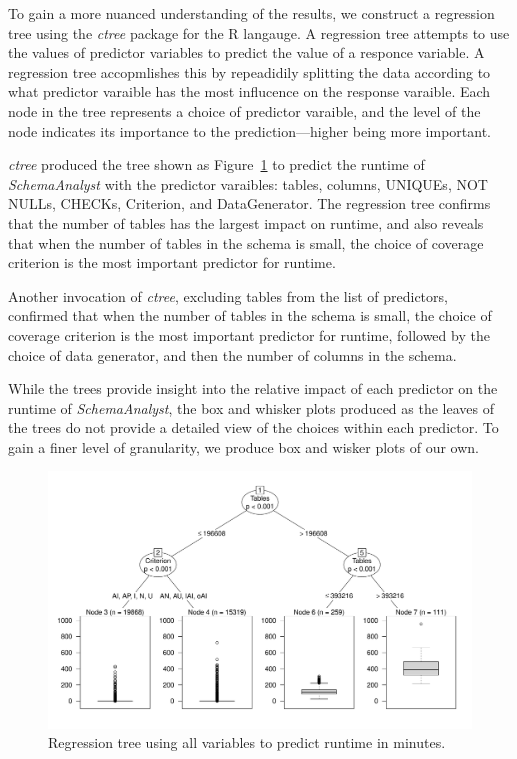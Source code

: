 
To gain a more nuanced understanding of the results, we construct a
regression tree using the \textit{ctree} package for the R langauge. A
regression tree attempts to use the values of predictor variables to
predict the value of a responce variable. A regression tree accopmlishes
this by repeadidily splitting the data according to what predictor varaible has the
most influcence on the response varaible. Each node in the tree represents a choice
of predictor varaible, and the level of the node indicates its
importance to the prediction---higher being more important.

\textit{ctree} produced the tree shown as Figure~\ref{fig:atree} to
predict the runtime of \textit{SchemaAnalyst} with the predictor varaibles:
tables, columns, UNIQUEs, NOT NULLs, CHECKs, Criterion, and
DataGenerator. The regression tree confirms that the number of
tables has the largest impact on runtime, and also reveals that when the number of tables in the schema is small, 
the choice of coverage criterion is the most important predictor for runtime.

Another invocation of \textit{ctree}, excluding tables from the list of
predictors, confirmed that when the number of tables in the schema is small, the choice of coverage criterion is the
most important predictor for runtime, followed by the choice of data
generator, and then the number of columns in the schema.

While the trees provide insight into the relative impact of each
predictor on the runtime of \textit{SchemaAnalyst}, the box and whisker
plots produced as the leaves of the trees do not provide a detailed view
of the choices within each predictor.  To gain a finer level of
granularity, we produce box and wisker plots of our own.

\begin{figure}
\centering
  \centering
  \includegraphics[width=.75\linewidth]{diagrams/AllTree.pdf}
  \caption{Regression tree using all variables to predict runtime in
  minutes. \vspace{-.15in}}
  \label{fig:atree}
  \vspace{-.15in}
\end{figure}
